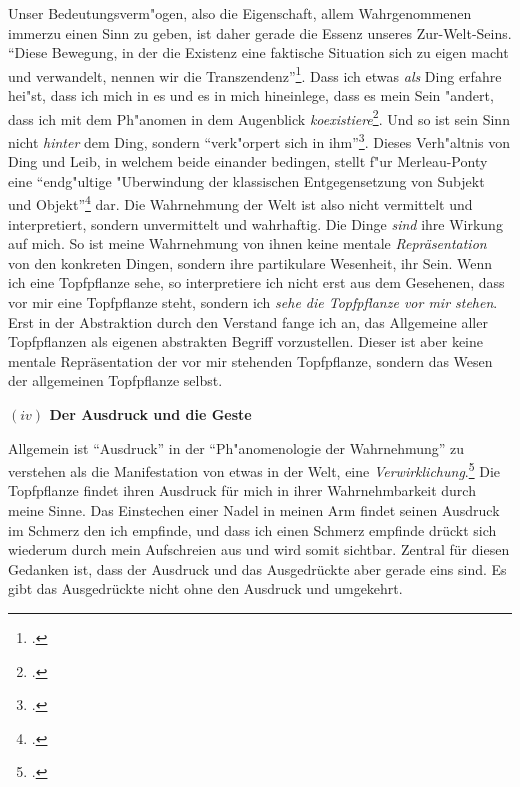 \documentclass[a4paper, 12pt]{article}
\begin{document}
\begin{onehalfspace}
Unser Bedeutungsverm"ogen, also die Eigenschaft, allem Wahrgenommenen immerzu einen Sinn zu geben, ist daher gerade die Essenz unseres Zur-Welt-Seins. "`Diese Bewegung, in der die Existenz eine faktische Situation sich zu eigen macht und verwandelt, nennen wir die Transzendenz"'\footnote{\Cite[Siehe][S. 202]{merleau1966phanomenologie}.}. Dass ich etwas \emph{als} Ding erfahre hei"st, dass ich mich in es und es in mich hineinlege, dass es mein Sein "andert, dass ich mit dem Ph"anomen in dem Augenblick \emph{koexistiere}\footnote{\Cite[Vgl.][S. 368]{merleau1966phanomenologie}.}. Und so ist sein Sinn nicht \emph{hinter} dem Ding, sondern "`verk"orpert sich in ihm"'\footnote{\Cite[Siehe][S. 370]{merleau1966phanomenologie}.}. Dieses Verh"altnis von Ding und Leib, in welchem beide einander bedingen, stellt f"ur Merleau-Ponty eine "`endg"ultige "Uberwindung der klassischen Entgegensetzung von Subjekt und Objekt"'\footnote{\Cite[Siehe][S. 207]{merleau1966phanomenologie}.} dar. Die Wahrnehmung der Welt ist also nicht vermittelt und interpretiert, sondern unvermittelt und wahrhaftig. Die Dinge \emph{sind} ihre Wirkung auf mich. So ist meine Wahrnehmung von ihnen keine mentale \emph{Repräsentation} von den konkreten Dingen, sondern ihre partikulare Wesenheit, ihr Sein. Wenn ich eine Topfpflanze sehe, so interpretiere ich nicht erst aus dem Gesehenen, dass vor mir eine Topfpflanze steht, sondern ich \emph{sehe die Topfpflanze vor mir stehen}. Erst in der Abstraktion durch den Verstand fange ich an, das Allgemeine aller Topfpflanzen als eigenen abstrakten Begriff vorzustellen. Dieser ist aber keine mentale Repräsentation der vor mir stehenden Topfpflanze, sondern das Wesen der allgemeinen Topfpflanze selbst.

\vspace{5mm}

\noindent\textbf{$(iv)$ Der Ausdruck und die Geste}

\noindent Allgemein ist "`Ausdruck"' in der "`Ph"anomenologie der Wahrnehmung"' zu verstehen als die Manifestation von etwas in der Welt, eine \emph{Verwirklichung}.\footnote{\Cite[Vgl.][S. 217]{merleau1966phanomenologie}.} Die Topfpflanze findet ihren Ausdruck für mich in ihrer Wahrnehmbarkeit durch meine Sinne. Das Einstechen einer Nadel in meinen Arm findet seinen Ausdruck im Schmerz den ich empfinde, und dass ich einen Schmerz empfinde drückt sich wiederum durch mein Aufschreien aus und wird somit sichtbar. Zentral für diesen Gedanken ist, dass der Ausdruck und das Ausgedrückte aber gerade eins sind. Es gibt das Ausgedrückte nicht ohne den Ausdruck und umgekehrt. 


\end{onehalfspace}
\end{document}

